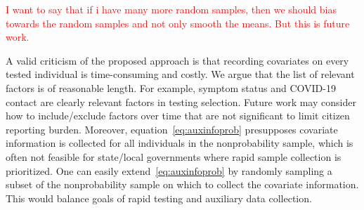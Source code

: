 \documentclass[11pt]{amsart}
\numberwithin{equation}{section}
\theoremstyle{plain}
\def\pr{\text{pr}}
\begin{document}
 \textcolor{red}{I want to say that if i have many more random samples, then we should bias towards the random samples and not only smooth the means. But this is future work.}

 A valid criticism of the proposed approach is that recording covariates on every tested individual is time-consuming and costly.  We argue that the list of relevant factors is of reasonable length.  For example, symptom status and COVID-19 contact are clearly relevant factors in testing selection.  Future work may consider how to include/exclude factors over time that are not significant to limit citizen reporting burden.  Moreover, equation~\eqref{eq:auxinfoprob} presupposes covariate information is collected for all individuals in the nonprobability sample, which is often not feasible for state/local governments where rapid sample collection is prioritized.  One can easily extend~\eqref{eq:auxinfoprob} by randomly sampling a subset of the nonprobability sample on which to collect the covariate information.
 This would balance goals of rapid testing and auxiliary data collection.

\newpage







\end{document}
